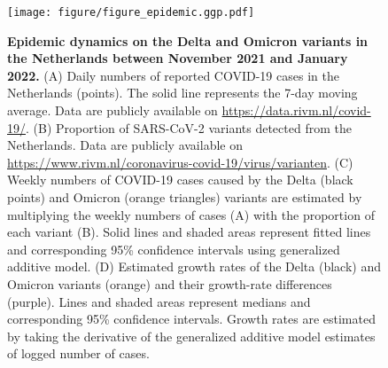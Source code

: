 \documentclass[12pt]{article}
\begin{document}
\begin{figure}[!ht]
\texttt{[image: figure/figure\_epidemic.ggp.pdf]}
\caption{
\textbf{Epidemic dynamics on the Delta and Omicron variants in the Netherlands between November 2021 and January 2022.}
(A) Daily numbers of reported COVID-19 cases in the Netherlands (points).
The solid line represents the 7-day moving average.
Data are publicly available on \url{https://data.rivm.nl/covid-19/}.
(B) Proportion of SARS-CoV-2 variants detected from the Netherlands. Data are publicly available on \url{https://www.rivm.nl/coronavirus-covid-19/virus/varianten}.
(C) Weekly numbers of COVID-19 cases caused by the Delta (black points) and Omicron (orange triangles) variants are estimated by multiplying the weekly numbers of cases (A) with the proportion of each variant (B).
Solid lines and shaded areas represent fitted lines and corresponding 95\% confidence intervals using generalized additive model.
(D) Estimated growth rates of the Delta (black) and Omicron variants (orange) and their growth-rate differences (purple).
Lines and shaded areas represent medians and corresponding 95\% confidence intervals.
Growth rates are estimated by taking the derivative of the generalized additive model estimates of logged number of cases.
\label{fig:epidemic}
}
\end{figure}
\end{document}
